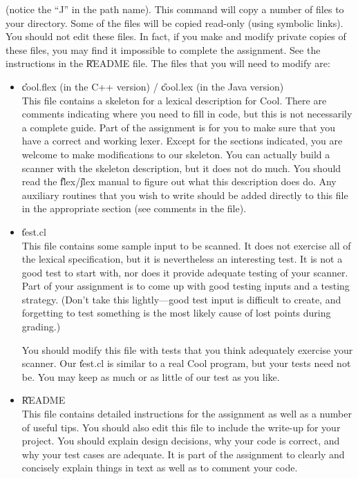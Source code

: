 \documentclass[11pt]{article}
\begin{document}
\noindent
(notice the ``J'' in the path name).  This command will copy a number of
files to your directory.  Some of the files will be copied read-only
(using symbolic links).  You should not edit these files.  In fact, if
you make and modify private copies of these files, you may find it
impossible to complete the assignment.  See the instructions in the
\U{README} file.  The files that you will need to modify are:
\begin{itemize}
\item \U{cool.flex} (in the C++ version) / \U{cool.lex} (in the Java version)\\
This file contains a skeleton for a lexical description for Cool.  There
are comments indicating where you need to fill in code, but this is not
necessarily a complete guide.  Part of the assignment is for you to
make sure that you have a correct and working lexer.  Except for the
sections indicated, you are welcome to make modifications to our
skeleton.  You
can actually build a scanner with the skeleton description, but it does not do
much. You should read the \U{flex}/\U{jlex} manual to figure out what
this description does do.  Any auxiliary routines that you wish to write
should be added directly to this file in the appropriate section (see
comments in the file).

\item \U{test.cl} \\
This file contains some sample input to be scanned. It does not exercise
all of the lexical specification, but it is nevertheless an interesting
test.  It is not a good test to start with, nor does it provide adequate
testing of your scanner.  Part of your assignment is to come up with
good testing inputs and a testing strategy.  (Don't take this
lightly---good test input is difficult to create, and forgetting to test
something is the most likely cause of lost points during grading.)

You should modify this file with tests that you think adequately
exercise your scanner.  Our \U{test.cl} is similar to a real Cool
program, but your tests need not be.  You may keep as much or as little
of our test as you like.

\item \U{README}\\
This file contains detailed instructions for the assignment as well as a
number of useful tips.  You should also edit this file to include the
write-up for your project.  You should explain design decisions, why your
code is correct, and why your test cases are adequate.  It is part of the
assignment to clearly and concisely explain things in text as well as to
comment your code.

\end{itemize}
\end{document}
